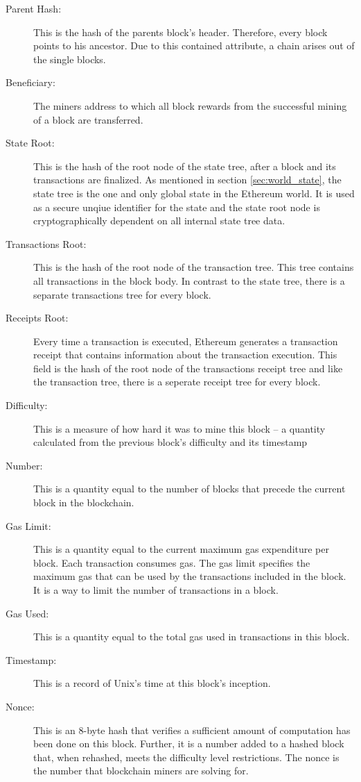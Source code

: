 \begin{description}
	\item[Parent Hash:] This is the hash of the parents block's header. Therefore, every block points to his ancestor. Due to this contained attribute, a chain arises out of the single blocks.
	\item[Beneficiary:] The miners address to which all block rewards from the successful mining of a block are transferred.
	\item[State Root:] This is the hash of the root node of the state tree, after a block and its transactions are finalized. As mentioned in section 
	\ref{sec:world_state}, the state tree is the one and only global state in the Ethereum world. It is used as a secure unqiue identifier for the state and the state root node is cryptographically dependent on all internal state tree data.
	\item[Transactions Root:] This is the hash of the root node of the transaction tree. This tree contains all transactions in the block body. In contrast to the state tree, there is a separate transactions tree for every block. 
	\item[Receipts Root:] Every time a transaction is executed, Ethereum generates a transaction receipt that contains information about the transaction execution. This field is the hash of the root node of the transactions receipt tree and like the transaction tree, there is a seperate receipt tree for every block.
	\item[Difficulty:] This is a measure of how hard it was to mine this block – a quantity calculated from the previous block’s difficulty and its timestamp
	\item[Number:] This is a quantity equal to the number of blocks that precede the current block in the blockchain.
	\item[Gas Limit:] This is a quantity equal to the current maximum gas expenditure per block. Each transaction consumes gas. The gas limit specifies the maximum gas that can be used by the transactions included in the block. It is a way to limit the number of transactions in a block.
	\item[Gas Used:] This is a quantity equal to the total gas used in transactions in this block.
	\item[Timestamp:] This is a record of Unix’s time at this block’s inception.
	\item[Nonce:] This is an 8-byte hash that verifies a sufficient amount of computation has been done on this block. Further, it is a number added to a hashed block that, when rehashed, meets the difficulty level restrictions. The nonce is the number that blockchain miners are solving for.
\end{description}

